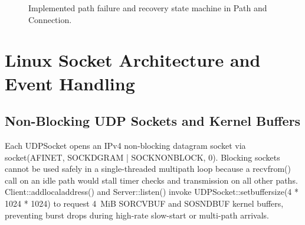 \documentclass[10pt,a4paper]{article}
\newcommand{\codeul}{\textunderscore\hspace{0pt}}
\DeclareRobustCommand{\code}[1]{{\ttfamily\let\_\codeul #1}}
\begin{document}
\begin{figure}[H]
\centering
{}
\caption{Implemented path failure and recovery state machine in \code{Path} and \code{Connection}.}
\label{fig:path_fsm}
\end{figure}

\section{Linux Socket Architecture and Event Handling}

\subsection{Non-Blocking UDP Sockets and Kernel Buffers}
Each \code{UDPSocket} opens an IPv4 non-blocking datagram socket via \code{socket(AF\_INET, SOCK\_DGRAM | SOCK\_NONBLOCK, 0)}. Blocking sockets cannot be used safely in a single-threaded multipath loop because a \code{recvfrom()} call on an idle path would stall timer checks and transmission on all other paths. \code{Client::add\_local\_address()} and \code{Server::listen()} invoke \code{UDPSocket::set\_buffer\_size(4 * 1024 * 1024)} to request 4~MiB \code{SO\_RCVBUF} and \code{SO\_SNDBUF} kernel buffers, preventing burst drops during high-rate slow-start or multi-path arrivals.
\end{document}
